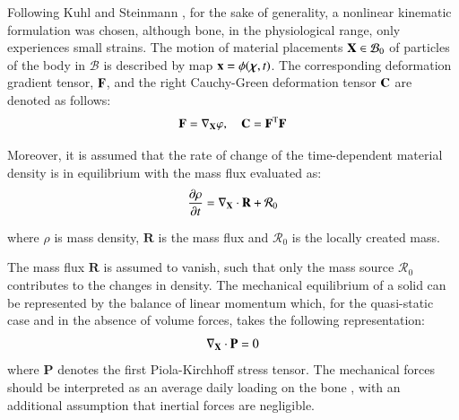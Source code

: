 \documentclass[11pt]{acmeArticle}
\numberwithin{equation}{section}
\begin{document}
Following Kuhl and Steinmann \citep{kuhl2003computational}, for the sake of generality, a nonlinear kinematic formulation was chosen, although bone, in the physiological range, only experiences small strains. The motion of material placements ${\boldsymbol {\rm X}} \in  \mathcal{B}_0 $ of particles of the body in $\mathcal{B}$ is described by map ${\boldsymbol {\rm x}} = \phi({\boldsymbol {\chi}},t)$. 
The corresponding deformation gradient tensor, $\boldsymbol {\rm F}$, and the right Cauchy-Green deformation tensor $\boldsymbol {\rm C}$  are denoted as follows: 
\begin{equation}
\mathbf{F}=\nabla_{\boldsymbol {\rm X}}\varphi, \quad \mathbf{C}=\mathbf{F}^{\rm T}\mathbf{F}
\end{equation}

Moreover, it is assumed that the rate of change of the time-dependent material density is in equilibrium with the mass flux evaluated as:
\begin{equation}
\frac{\partial\rho}{\partial t}= \nabla_{\boldsymbol {\rm X}} \cdot \mathbf{R} + \mathcal{R}_0
\label{eq:mass_balance}
\end{equation}

where $\rho$ is mass density, $\mathbf{R}$ is the mass flux and $\mathcal{R}_0$ is the locally created mass.


The mass flux $\mathbf{R}$ is assumed to vanish, such that only the mass source $\mathcal{R}_0$ contributes to the changes in density. 
The mechanical equilibrium of a solid can be represented by the balance of linear momentum which, for the quasi-static case and in the absence of volume forces, takes the following representation:
\begin{equation}
\nabla_{\boldsymbol {\rm X}} \cdot \mathbf{{\mathbf{P}}} = 0
\label{eq:momentum_balance}
\end{equation}
where $\mathbf{P}$ denotes the first Piola-Kirchhoff stress tensor. 
The mechanical forces should be interpreted as an average daily loading on the bone \citep{kuhl2003computational}, with an additional assumption that inertial forces are negligible. 
\end{document}
